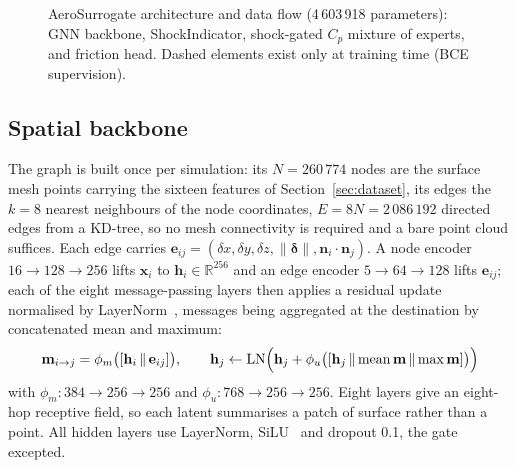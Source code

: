 \documentclass{WCCM-ECCOMAS_2026_Full_Paper}
\begin{document}
\begin{figure}[htbp]
{}
\caption{AeroSurrogate architecture and data flow (4\,603\,918
  parameters): GNN backbone, ShockIndicator, shock-gated $C_p$ mixture
  of experts, and friction head.  Dashed elements exist only at
  training time (BCE supervision).}
\label{fig:architecture}
\end{figure}

\subsection{Spatial backbone}
\label{sec:backbone}

The graph is built once per simulation: its $N = 260\,774$ nodes are
the surface mesh points carrying the sixteen features of
Section~\ref{sec:dataset}, its edges the $k=8$ nearest neighbours of
the node coordinates, $E = 8N = 2\,086\,192$ directed edges from a
KD-tree, so no mesh connectivity is required and a bare point cloud
suffices.  Each edge carries $\mathbf{e}_{ij} = (\delta x, \delta y,
\delta z, \|\boldsymbol{\delta}\|,
\mathbf{n}_i\!\cdot\!\mathbf{n}_j)$.  A node encoder
$16\!\to\!128\!\to\!256$ lifts $\mathbf{x}_i$ to
$\mathbf{h}_i\in\mathbb{R}^{256}$ and an edge encoder
$5\!\to\!64\!\to\!128$ lifts $\mathbf{e}_{ij}$; each of the eight
message-passing layers then applies a residual update normalised by
LayerNorm~\cite{Ba2016}, messages being aggregated at the destination
by concatenated mean and maximum:
\begin{equation}
  \mathbf{m}_{i\to j} =
    \phi_{m}\bigl([\mathbf{h}_i \,\|\, \mathbf{e}_{ij}]\bigr),
  \qquad
  \mathbf{h}_j \leftarrow
    \mathrm{LN}\Bigl(\mathbf{h}_j + \phi_{u}\bigl([\mathbf{h}_j \,\|\,
      \mathrm{mean}\,\mathbf{m} \,\|\, \mathrm{max}\,\mathbf{m}]\bigr)\Bigr)
  \label{eq:backbone}
\end{equation}
with $\phi_m: 384\!\to\!256\!\to\!256$ and
$\phi_u: 768\!\to\!256\!\to\!256$.  Eight layers give an eight-hop
receptive field, so each latent summarises a patch of surface rather
than a point.  All hidden layers use LayerNorm, SiLU~\cite{Elfwing2018}
and dropout 0.1, the gate excepted.
\end{document}
